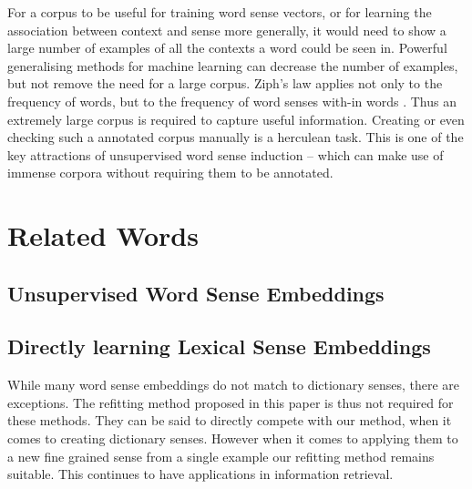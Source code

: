\documentclass{sig-alternate}
\begin{document}
For a corpus to be useful for training word sense vectors, or for learning the association between context and sense more generally, it would need to show a large number of examples of all the contexts a word could be seen in. Powerful generalising methods for machine learning can decrease the number of examples, but not remove the need for a large corpus. Ziph's law applies not only to the frequency of words, but to the frequency of word senses with-in words . Thus an extremely large corpus is required to capture useful information. Creating or even checking such a annotated corpus manually is a herculean task. This is one of the key attractions of unsupervised word sense induction -- which can make use of immense corpora without requiring them to be annotated.



\section{Related Words}

\subsection{Unsupervised Word Sense Embeddings}



\subsection{Directly learning Lexical Sense Embeddings}
While many word sense embeddings do not match to dictionary senses, there are exceptions.
The refitting method proposed in this paper is thus not required for these methods.
They can be said to directly compete with our method, when it comes to creating dictionary senses. However when it comes to applying them to a new fine grained sense from a single example our refitting method remains suitable. This continues to have applications in information retrieval.
\end{document}

